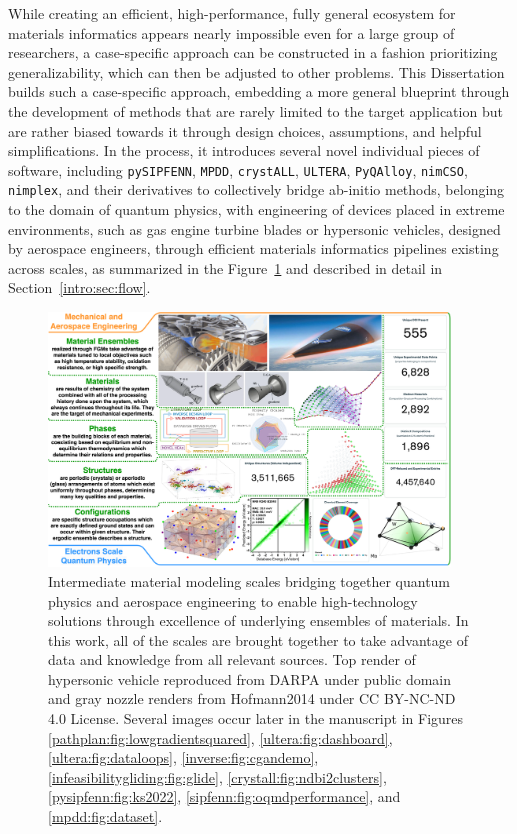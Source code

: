 While creating an efficient, high-performance, fully general ecosystem for materials informatics appears nearly impossible even for a large group of researchers, a case-specific approach can be constructed in a fashion prioritizing generalizability, which can then be adjusted to other problems. This Dissertation builds such a case-specific approach, embedding a more general blueprint through the development of methods that are rarely limited to the target application but are rather biased towards it through design choices, assumptions, and helpful simplifications. In the process, it introduces several novel individual pieces of software, including \texttt{pySIPFENN}, \texttt{MPDD}, \texttt{crystALL}, \texttt{ULTERA}, \texttt{PyQAlloy}, \texttt{nimCSO}, \texttt{nimplex}, and their derivatives to collectively bridge ab-initio methods, belonging to the domain of quantum physics, with engineering of devices placed in extreme environments, such as gas engine turbine blades or hypersonic vehicles, designed by aerospace engineers, through efficient materials informatics pipelines existing across scales, as summarized in the Figure~\ref{intro:fig:bigpicture} and described in detail in Section~\ref{intro:sec:flow}.

\begin{figure}[H]
    \centering
    \includegraphics[width=0.95\textwidth]{intro/DissertationBigPicture.png}
    \caption{
    Intermediate material modeling scales bridging together quantum physics and aerospace engineering to enable high-technology solutions through excellence of underlying ensembles of materials. In this work, all of the scales are brought together to take advantage of data and knowledge from all relevant sources. Top render of hypersonic vehicle reproduced from DARPA under public domain and gray nozzle renders from Hofmann2014 under CC BY-NC-ND 4.0 License. Several images occur later in the manuscript in Figures \ref{pathplan:fig:lowgradientsquared}, \ref{ultera:fig:dashboard}, \ref{ultera:fig:dataloops}, \ref{inverse:fig:cgandemo}, \ref{infeasibilitygliding:fig:glide}, \ref{crystall:fig:ndbi2clusters}, \ref{pysipfenn:fig:ks2022}, \ref{sipfenn:fig:oqmdperformance}, and \ref{mpdd:fig:dataset}.
    }
    \label{intro:fig:bigpicture}
\end{figure}

